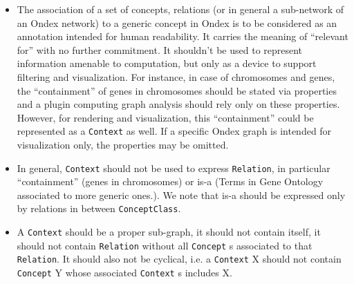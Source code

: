 \documentclass[a4paper,10pt]{article}
\newcommand{\term}[1]{\texttt{#1}\xspace}
\newcommand{\co}{\term{Concept}}
\newcommand{\cxt}{\term{Context}}
\newcommand{\re}{\term{Relation}}
\begin{document}
\begin{itemize}
\item The association of a set of concepts, relations (or in general a sub-network of an Ondex network) to a generic concept in Ondex is to be considered as an annotation intended for human readability. It carries the meaning of ``relevant for'' with no further commitment. It shouldn't be used to represent information amenable to computation, but only as a device to support filtering and visualization. For instance, in case of chromosomes and genes, the ``containment'' of genes in chromosomes should be stated via properties and a plugin computing graph analysis should rely only on these properties. However, for rendering and visualization, this ``containment'' could be represented as a \cxt as well. If a specific Ondex graph is intended for visualization only, the properties may be omitted.

\item In general, \cxt should not be used to express \re, in particular ``containment'' (genes in chromosomes) or is-a (Terms in Gene Ontology associated to more generic ones.). We note that is-a should be expressed only by relations in between \term{ConceptClass}.

\item A \cxt should be a proper sub-graph, it should not contain itself, it should not contain \re without all \co s associated to that \re. It should also not be cyclical, i.e. a \cxt X should not contain \co Y whose associated \cxt s includes X.


\end{itemize}
\end{document}
